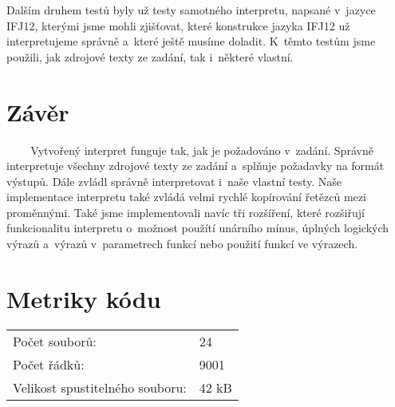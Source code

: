 \documentclass[12pt,a4paper,titlepage,final]{article}
\begin{document}
Dalším druhem testů byly už testy samotného interpretu, napsané v~jazyce IFJ12, 
kterými jsme mohli zjišťovat, které konstrukce jazyka IFJ12 už interpretujeme 
správně a~které ještě musíme doladit. K~těmto testům jsme použili, jak zdrojové 
texty ze zadání, tak i~některé vlastní.

\section{Závěr} \label{zaver}
~ ~ ~Vytvořený interpret funguje tak, jak je požadováno v~zadání. Správně interpretuje 
všechny zdrojové texty ze zadání a~splňuje požadavky na formát výstupů. Dále zvládl 
správně interpretovat i~naše vlastní testy. Naše implementace interpretu také zvládá 
velmi rychlé kopírování řetězců mezi proměnnými. Také jsme implementovali navíc tři 
rozšíření, které rozšiřují funkcionalitu interpretu o~možnost použítí unárního mínus, 
úplných logických výrazů a~výrazů v~parametrech funkcí nebo použití funkcí ve výrazech.

\section{Metriky kódu} \label{metriky}
\begin{tabular}{ll}
  Počet souborů: & 24 \\
  Počet řádků: & 9001 \\
  Velikost spustitelného souboru: & 42 kB \\
\end{tabular}

%
%
%
\appendix
\end{document}
